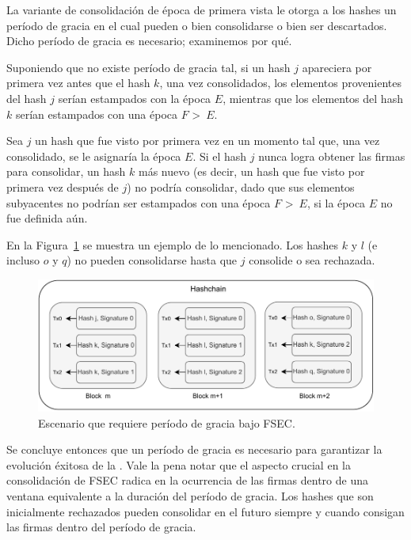 La variante de consolidación de época de primera vista le otorga a los hashes un período
de gracia en el cual pueden o bien consolidarse o bien ser descartados.
%
Dicho período de gracia es necesario; examinemos por qué.


Suponiendo que no existe período de gracia tal, si un hash $j$ apareciera por primera vez
antes que el hash $k$, una vez consolidados, los elementos provenientes del hash $j$
serían estampados con la época $E$, mientras que los elementos del hash $k$ serían estampados
con una época $F$ \textgreater \ $E$.
%

Sea $j$ un hash que fue visto por primera vez en un momento tal que, una vez consolidado,
se le asignaría la época $E$.
%
Si el hash $j$ nunca logra obtener las \SPH firmas para
consolidar, un hash $k$ más nuevo (es decir, un hash que fue visto por primera vez
después de $j$) no podría consolidar, dado que sus elementos subyacentes no podrían ser
estampados con una época $F$ \textgreater \ $E$, si la época $E$ no fue definida aún.
%

En la Figura~\ref{fig:grace_period} se muestra un ejemplo de lo mencionado. Los hashes
$k$ y $l$ (e incluso $o$ y $q$) no pueden consolidarse hasta que $j$ consolide o sea rechazada.

\begin{figure}
  \centering
  \includegraphics[scale=0.7]{figures/grace_period.pdf}
  \caption{Escenario que requiere período de gracia bajo FSEC.}
  \label{fig:grace_period}
\end{figure}

%
Se concluye entonces que un período de gracia es necesario para garantizar la evolución
éxitosa de la \hashchain. 
%
Vale la pena notar que el aspecto crucial en la consolidación de FSEC radica en la ocurrencia
de las \SPH firmas dentro de una ventana equivalente a la duración
del período de gracia.
%
Los hashes que son inicialmente rechazados pueden consolidar en el futuro siempre y cuando
consigan las \SPH firmas dentro del período de gracia.
%

